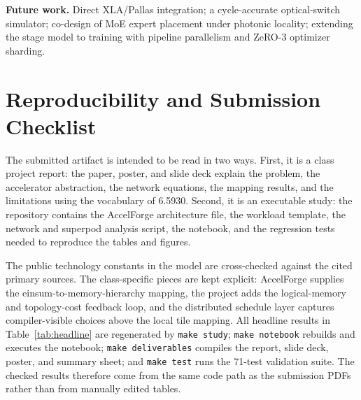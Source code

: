 \documentclass[conference]{IEEEtran}
\newcommand{\tabref}[1]{Table~\ref{#1}}
\begin{document}
\textbf{Future work.} Direct XLA/Pallas integration; a
cycle-accurate optical-switch simulator; co-design of MoE expert
placement under photonic locality; extending the stage model to
training with pipeline parallelism and ZeRO-3 optimizer sharding.

\clearpage
\section{Reproducibility and Submission Checklist}
The submitted artifact is intended to be read in two ways. First, it
is a class project report: the paper, poster, and slide deck explain
the problem, the accelerator abstraction, the network equations, the
mapping results, and the limitations using the vocabulary of
6.5930. Second, it is an executable study: the repository contains
the AccelForge architecture file, the workload template, the network
and superpod analysis script, the notebook, and the regression tests
needed to reproduce the tables and figures.

The public technology constants in the model are cross-checked
against the cited primary sources. The class-specific pieces are
kept explicit: AccelForge supplies the einsum-to-memory-hierarchy
mapping, the project adds the logical-memory and topology-cost
feedback loop, and the distributed schedule layer captures
compiler-visible choices above the local tile mapping. All headline
results in \tabref{tab:headline} are regenerated by
\texttt{make study}; \texttt{make notebook} rebuilds and executes
the notebook; \texttt{make deliverables} compiles the report, slide
deck, poster, and summary sheet; and \texttt{make test} runs the
71-test validation suite. The checked results therefore come from
the same code path as the submission PDFs rather than from manually
edited tables.
\end{document}
